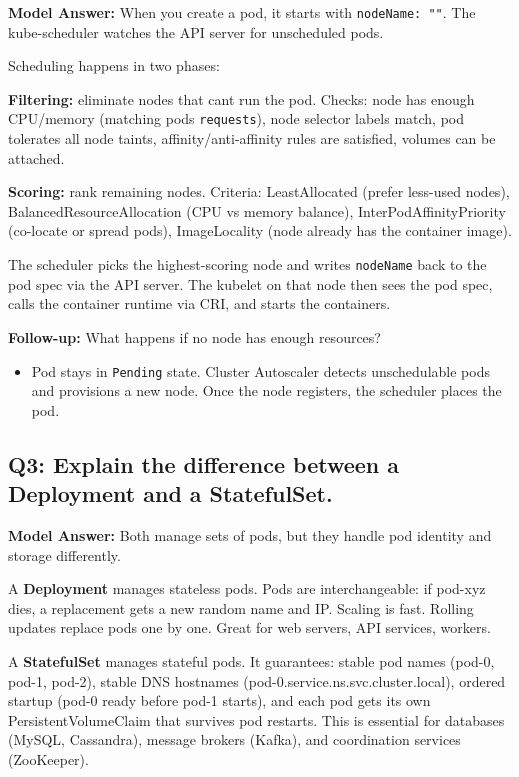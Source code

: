 \documentclass[11pt]{article}
\providecommand{\tightlist}{\setlength{\itemsep}{1pt}\setlength{\parskip}{0pt}}
\begin{document}
\textbf{Model Answer:}
When you create a pod, it starts with \texttt{nodeName:\ ""}. The kube-scheduler watches the API server for unscheduled pods.

Scheduling happens in two phases:

\textbf{Filtering:} eliminate nodes that can\textquotesingle t run the pod. Checks: node has enough CPU/memory (matching pod\textquotesingle s \texttt{requests}), node selector labels match, pod tolerates all node taints, affinity/anti-affinity rules are satisfied, volumes can be attached.

\textbf{Scoring:} rank remaining nodes. Criteria: LeastAllocated (prefer less-used nodes), BalancedResourceAllocation (CPU vs memory balance), InterPodAffinityPriority (co-locate or spread pods), ImageLocality (node already has the container image).

The scheduler picks the highest-scoring node and writes \texttt{nodeName} back to the pod spec via the API server. The kubelet on that node then sees the pod spec, calls the container runtime via CRI, and starts the containers.

\textbf{Follow-up:} What happens if no node has enough resources?

\begin{itemize}
\tightlist
\item
  Pod stays in \texttt{Pending} state. Cluster Autoscaler detects unschedulable pods and provisions a new node. Once the node registers, the scheduler places the pod.
\end{itemize}

\subsection{Q3: Explain the difference between a Deployment and a StatefulSet.}\label{q3-explain-the-difference-between-a-deployment-and-a-statefulset}

\textbf{Model Answer:}
Both manage sets of pods, but they handle pod identity and storage differently.

A \textbf{Deployment} manages stateless pods. Pods are interchangeable: if pod-xyz dies, a replacement gets a new random name and IP. Scaling is fast. Rolling updates replace pods one by one. Great for web servers, API services, workers.

A \textbf{StatefulSet} manages stateful pods. It guarantees: stable pod names (pod-0, pod-1, pod-2), stable DNS hostnames (pod-0.service.ns.svc.cluster.local), ordered startup (pod-0 ready before pod-1 starts), and each pod gets its own PersistentVolumeClaim that survives pod restarts. This is essential for databases (MySQL, Cassandra), message brokers (Kafka), and coordination services (ZooKeeper).
\end{document}
